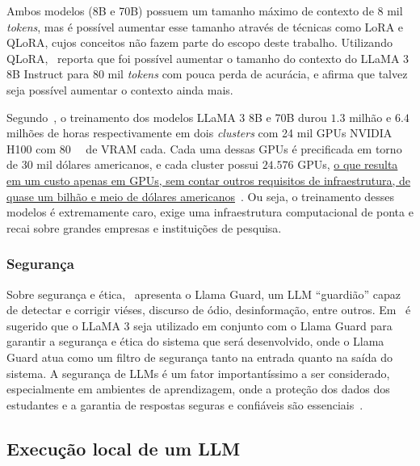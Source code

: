 \documentclass[journal]{IEEEtran}
\begin{document}
Ambos modelos (8B e 70B) possuem um tamanho máximo de contexto de 8 mil \textit{tokens}, mas é possível aumentar esse tamanho através de técnicas como LoRA e QLoRA, cujos conceitos não fazem parte do escopo deste trabalho.
Utilizando QLoRA,~\cite{zhang2024extending} reporta que foi possível aumentar o tamanho do contexto do LLaMA 3 8B Instruct para 80 mil \textit{tokens} com pouca perda de acurácia, e afirma que talvez seja possível aumentar o contexto ainda mais.

Segundo~\cite{meta2024llama3}, o treinamento dos modelos LLaMA 3 8B e 70B durou $1.3$ milhão e $6.4$ milhões de horas respectivamente em dois \textit{clusters} com 24 mil GPUs NVIDIA H100 com \SI{80}{\giga\byte} de VRAM cada.
Cada uma dessas GPUs é precificada em torno de 30 mil dólares americanos, e cada cluster possui $24.576$ GPUs, \ul{o que resulta em um custo apenas em GPUs, sem contar outros requisitos de infraestrutura, de quase um bilhão e meio de dólares americanos}~\cite{metagenaiinfra}.
Ou seja, o treinamento desses modelos é extremamente caro, exige uma infraestrutura computacional de ponta e recai sobre grandes empresas e instituições de pesquisa.

\subsubsection{Segurança}
Sobre segurança e ética,~\cite{inan2023llama} apresenta o Llama Guard, um LLM ``guardião'' capaz de detectar e corrigir viéses, discurso de ódio, desinformação, entre outros.
Em~\cite{meta2024llama3} é sugerido que o LLaMA 3 seja utilizado em conjunto com o Llama Guard para garantir a segurança e ética do sistema que será desenvolvido, onde o Llama Guard atua como um filtro de segurança tanto na entrada quanto na saída do sistema.
A segurança de LLMs é um fator importantíssimo a ser considerado, especialmente em ambientes de aprendizagem, onde a proteção dos dados dos estudantes e a garantia de respostas seguras e confiáveis são essenciais~\cite{inan2023llama,meta2024llama3,llama3modelcard}.

\subsection{Execução local de um LLM\label{sec:llm_local}}
\end{document}
